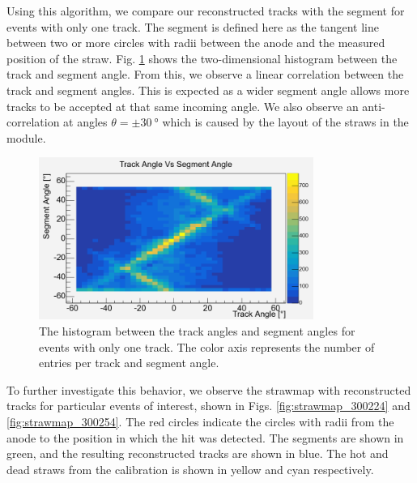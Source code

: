 \documentclass[a4paper]{report}
\numberwithin{equation}{section}
\begin{document}
Using this algorithm, we compare our reconstructed tracks with the segment for events with only one track. 
The segment is defined here as the tangent line between two or more circles with radii between the anode and the measured position of the straw. 
Fig. \ref{fig:trackvssegment} shows the two-dimensional histogram between the track and segment angle. From this, we observe a linear correlation between the track and segment angles. This is expected as a wider segment angle allows more tracks to be accepted at 
that same incoming angle. We also observe an anti-correlation at angles $\theta = \pm \SI{30}{\degree}$ which is caused by the 
layout of the straws in the module. \par 

\begin{figure}[htb!]
	\centering
	\includegraphics[width=0.8\textwidth]{tracksvssegments.png}
	\caption{The histogram between the track angles and segment angles for events with only one track. The 
	color axis represents the number of entries per track and segment angle.}
	\label{fig:trackvssegment}
\end{figure}

To further investigate this behavior, we observe the strawmap with reconstructed tracks for particular events of interest, shown in Figs. 
\ref{fig:strawmap_300224} and \ref{fig:strawmap_300254}. The red circles indicate the circles with radii from the anode to the 
position in which the hit was detected. The segments are shown in green, and the resulting reconstructed tracks are shown in blue. 
The hot and dead straws from the calibration is shown in yellow and cyan respectively.\par 
\end{document}

